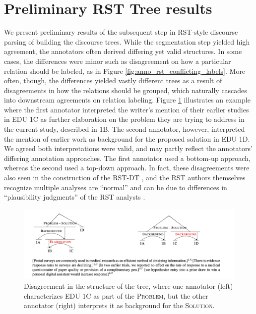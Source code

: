 \section{Preliminary RST Tree results}
\label{sec:anno_rst_trees}
We present preliminary results of the subsequent step in RST-style discourse parsing of building the discourse trees. While the segmentation step yielded high agreement, the annotators often derived differing yet valid structures. In some cases, the differences were minor such as disagreement on how a particular relation should be labeled, as in Figure \ref{fig:anno_rst_conflicting_labels}. More often, though, the differences yielded vastly different trees as a result of disagreements in how the relations should be grouped, which naturally cascades into downstream agreements on relation labeling. Figure \ref{fig:anno_rst_conflicting_trees} illustrates an example where the first annotator interpreted the writer's mention of their earlier studies in EDU 1C as further elaboration on the problem they are trying to address in the current study, described in 1B. The second annotator, however, interpreted the mention of earlier work as background for the proposed solution in EDU 1D. We agreed both interpretations were valid, and may partly reflect the annotators' differing annotation approaches. The first annotator used a bottom-up approach, whereas the second used a top-down approach. In fact, these disagreements were also seen in the construction of the RST-DT \cite{Carlson:2001}, and the RST authors themselves recognize multiple analyses are ``normal'' and can be due to differences in ``plausibility judgments'' of the RST analysts \cite{Mann:1992}. 

\begin{figure}
    \centering
    \includegraphics[scale=0.62]{plots/anno_rst_conflicting_trees.pdf}
    \caption{Disagreement in the structure of the tree, where one annotator (left) characterizes EDU 1C   as part of the \textsc{Problem}, but the other annotator (right) interprets it as background for the \textsc{Solution}.}
    \label{fig:anno_rst_conflicting_trees}
\end{figure}

